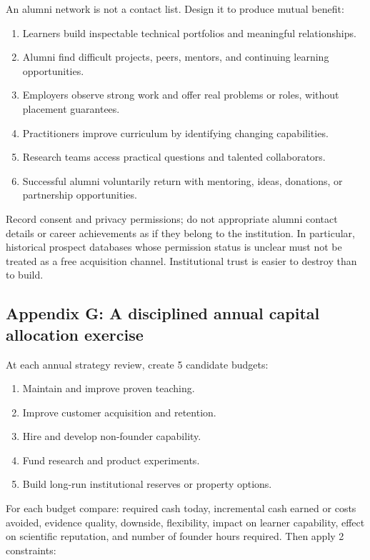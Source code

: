 An alumni network is not a contact list. Design it to produce mutual benefit:

\begin{enumerate}[leftmargin=*,itemsep=1.5pt]
  \item Learners build inspectable technical portfolios and meaningful relationships.
  \item Alumni find difficult projects, peers, mentors, and continuing learning opportunities.
  \item Employers observe strong work and offer real problems or roles, without placement guarantees.
  \item Practitioners improve curriculum by identifying changing capabilities.
  \item Research teams access practical questions and talented collaborators.
  \item Successful alumni voluntarily return with mentoring, ideas, donations, or partnership opportunities.
\end{enumerate}

Record consent and privacy permissions; do not appropriate alumni contact details or career achievements as if they belong to the institution. In particular, historical prospect databases whose permission status is unclear must not be treated as a free acquisition channel. Institutional trust is easier to destroy than to build.

\subsection{Appendix G: A disciplined annual capital allocation exercise}

At each annual strategy review, create 5 candidate budgets:

\begin{enumerate}[leftmargin=*,itemsep=1.5pt]
  \item Maintain and improve proven teaching.
  \item Improve customer acquisition and retention.
  \item Hire and develop non-founder capability.
  \item Fund research and product experiments.
  \item Build long-run institutional reserves or property options.
\end{enumerate}

For each budget compare: required cash today, incremental cash earned or costs avoided, evidence quality, downside, flexibility, impact on learner capability, effect on scientific reputation, and number of founder hours required. Then apply 2 constraints:

